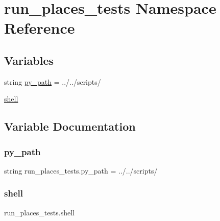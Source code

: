 \hypertarget{namespacerun__places__tests}{}\section{run\+\_\+places\+\_\+tests Namespace Reference}
\label{namespacerun__places__tests}
\subsection*{Variables}
\begin{DoxyCompactItemize}
\item 
string \hyperlink{namespacerun__places__tests_a1fbd01662008d159e93b9467b3a44274}{py\+\_\+path} = \textquotesingle{}../../scripts/\textquotesingle{}
\item 
\hyperlink{namespacerun__places__tests_a28f6ffe128c2ac6d6c5f2177ab7b249f}{shell}
\end{DoxyCompactItemize}


\subsection{Variable Documentation}
\mbox{\label{namespacerun__places__tests_a1fbd01662008d159e93b9467b3a44274}} 
\subsubsection{\texorpdfstring{py\+\_\+path}{py\_path}}
{\footnotesize\ttfamily string run\+\_\+places\+\_\+tests.\+py\+\_\+path = \textquotesingle{}../../scripts/\textquotesingle{}}

\mbox{\label{namespacerun__places__tests_a28f6ffe128c2ac6d6c5f2177ab7b249f}} 
\subsubsection{\texorpdfstring{shell}{shell}}
{\footnotesize\ttfamily run\+\_\+places\+\_\+tests.\+shell}

